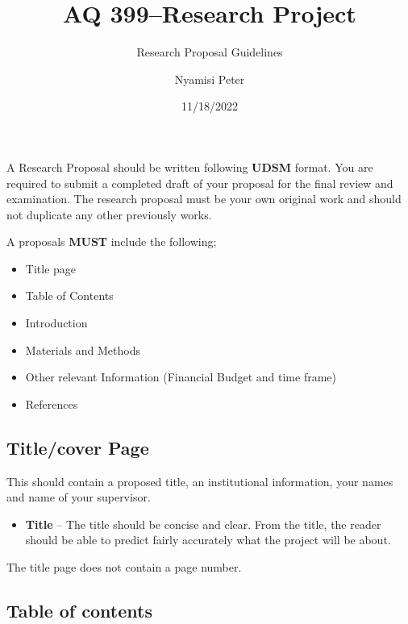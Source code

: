 \documentclass[
  12pt,
  a4paper,
  DIV=11,
  numbers=noendperiod]{scrartcl}
\title{AQ 399--Research Project}
\subtitle{Research Proposal Guidelines}
\author{Nyamisi Peter}
\date{11/18/2022}
\providecommand{\tightlist}{%
  \setlength{\itemsep}{0pt}\setlength{\parskip}{0pt}}\usepackage{longtable,booktabs,array}
\renewcommand*\contentsname{Table of contents}
\newcommand\contentsname{Table of contents}
\begin{document}
\maketitle
\ifdefined\Shaded\renewenvironment{Shaded}{\begin{tcolorbox}[sharp corners, interior hidden, frame hidden, enhanced, borderline west={3pt}{0pt}{shadecolor}, breakable, boxrule=0pt]}{\end{tcolorbox}}\fi

\renewcommand*\contentsname{Table of contents}
{
\hypersetup{linkcolor=}
\setcounter{tocdepth}{3}
\tableofcontents
}
\listoffigures
\listoftables
{}
A Research Proposal should be written following \textbf{UDSM} format.
You are required to submit a completed draft of your proposal for the
final review and examination. The research proposal must be your own
original work and should not duplicate any other previously works.

A proposals \textbf{MUST} include the following;

\begin{itemize}
\item
  Title page
\item
  Table of Contents
\item
  Introduction
\item
  Materials and Methods
\item
  Other relevant Information (Financial Budget and time frame)
\item
  References
\end{itemize}

\hypertarget{titlecover-page}{%
\subsection*{Title/cover Page}\label{titlecover-page}}

This should contain a proposed title, an institutional information, your
names and name of your supervisor.

\begin{itemize}
\tightlist
\item
  \textbf{Title} -- The title should be concise and clear. From the
  title, the reader should be able to predict fairly accurately what the
  project will be about.
\end{itemize}

The title page does not contain a page number.

\hypertarget{table-of-contents}{%
\subsection*{Table of contents}\label{table-of-contents}}
\end{document}
